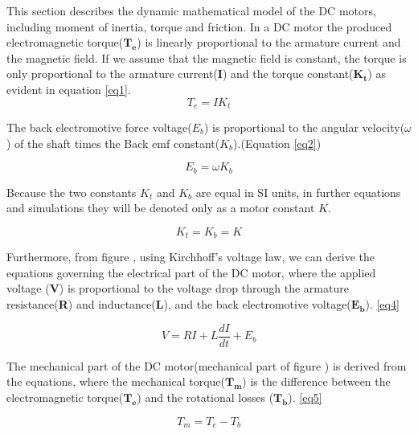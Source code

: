 This section describes the dynamic mathematical model of the DC motors, including moment of inertia, torque and friction. In a DC motor the produced electromagnetic torque($\boldsymbol{T_e}$) is linearly proportional to the armature current and the magnetic field. If we assume that the magnetic field is constant, the torque is only proportional to the armature current(\textbf{I}) and the torque constant($\boldsymbol{K_t}$) as evident in equation \ref{eq1}. \\

\begin{equation} \label{eq1} 
T_e = IK_t
\end{equation}

The back electromotive force voltage($E_b$) is proportional to the angular velocity($\omega$) of the shaft times the Back emf constant($K_b$).(Equation \ref{eq2})

\begin{equation} \label{eq2}
E_b = \omega K_b
\end{equation}

Because the two constants $K_t$ and $K_b$ are equal in SI units, in further equations and simulations they will be denoted only as a motor constant $K$.

\begin{equation} \label{eq3}
K_t = K_b = K
\end{equation} 

Furthermore, from figure , using Kirchhoff's voltage law, we can derive the equations governing the electrical part of the DC motor, where the applied voltage (\textbf{V}) is proportional to the voltage drop through the armature resistance(\textbf{R}) and inductance(\textbf{L}), and the back electromotive voltage($\boldsymbol{E_b}$). \ref{eq4}

\begin{equation} \label{eq4}
V = RI + L\frac{dI}{dt} + E_b
\end{equation} 

The mechanical part of the DC motor(mechanical part of figure ) is derived from the equations, where the mechanical torque($\boldsymbol{T_m}$) is the difference between the electromagnetic torque($\boldsymbol{T_e}$) and the rotational losses ($\boldsymbol{T_b}$). \ref{eq5}

\begin{equation} \label{eq5} 
T_m = T_e - T_b
\end{equation} 

